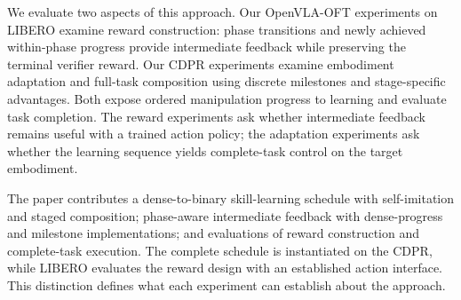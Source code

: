 We evaluate two aspects of this approach. Our OpenVLA-OFT experiments on LIBERO examine reward construction: phase transitions and newly achieved within-phase progress provide intermediate feedback while preserving the terminal verifier reward. Our CDPR experiments examine embodiment adaptation and full-task composition using discrete milestones and stage-specific advantages. Both expose ordered manipulation progress to learning and evaluate task completion. The reward experiments ask whether intermediate feedback remains useful with a trained action policy; the adaptation experiments ask whether the learning sequence yields complete-task control on the target embodiment.

The paper contributes a dense-to-binary skill-learning schedule with self-imitation and staged composition; phase-aware intermediate feedback with dense-progress and milestone implementations; and evaluations of reward construction and complete-task execution. The complete schedule is instantiated on the CDPR, while LIBERO evaluates the reward design with an established action interface. This distinction defines what each experiment can establish about the approach.
